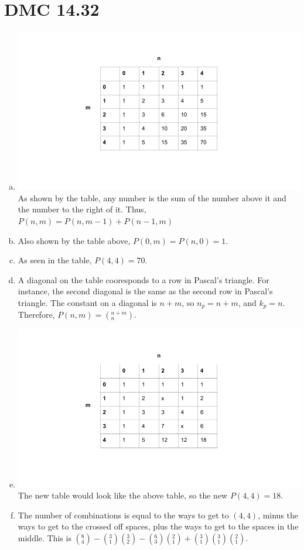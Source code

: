 \documentclass[]{article}
\def\math#1{$#1$}
\begin{document}
\section{DMC 14.32}
\begin{enumerate}[(a)]
\item \includegraphics[width=\linewidth]{HW7a}
As shown by the table, any number is the sum of the number above it and the number to the right of it. Thus, 
\math{P(n, m) = P(n, m-1) + P(n-1, m)}

\item Also shown by the table above, \math{P(0, m) = P(n, 0) = 1}.

\item As seen in the table, \math{P(4, 4) = 70}.

\item A diagonal on the table cooresponds to a row in Pascal's triangle. For instance, the second diagonal is the 
same as the second row in Pascal's triangle. The constant on a diagonal is \math{n+m}, so \math{n_p = n+m}, 
and \math{k_p = n}. Therefore, \math{P(n, m) = (_n^{n+m})}.

\item \includegraphics[width=\linewidth]{HW7b}
 The new table would look like the above table, so the new \math{P(4, 4) = 18}.

\item The number of combinations is equal to the ways to get to \math{(4, 4)}, minus the ways to get to the crossed 
off spaces, plus the ways to get to the spaces in the middle. This is \math{(_4^8) - (_1^3)(_2^3) - (_3^6)(_1^2) + (_1^3)(_1^3)(_1^2)}.

\end{enumerate}
\end{document}
